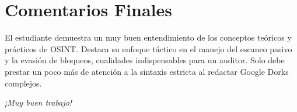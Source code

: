 \documentclass[12pt,a4paper]{article}
\begin{document}
\vspace{1cm}

\section*{Comentarios Finales}
\noindent El estudiante demuestra un muy buen entendimiento de los conceptos teóricos y prácticos de OSINT. Destaca su enfoque táctico en el manejo del escaneo pasivo y la evasión de bloqueos, cualidades indispensables para un auditor. Solo debe prestar un poco más de atención a la sintaxis estricta al redactar Google Dorks complejos.

\vspace{0.5cm}
\begin{center}
    \textit{¡Muy buen trabajo!}
\end{center}
\end{document}

